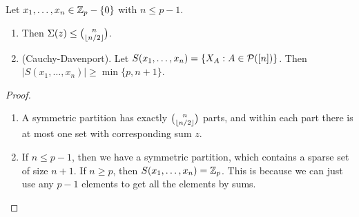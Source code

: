 \begin{corollary} Let $x_1,\dotsc,x_n\in \Z_p\setminus\{0\}$ with $n\leq p-1$.
~\begin{enumerate}
	\item  Then $\Sigma(z) \leq {n \choose \floor{n/2}}$.
	\item (Cauchy-Davenport). Let $S(x_1,\dotsc,x_n) = \{ X_A: A\in \P([n])\}$. Then $|S(x_1,\dotsc,x_n)| \geq \min\{ p,n+1\}$.
\end{enumerate}

\end{corollary}
\begin{proof}	
~ \begin{enumerate}
	\item  A symmetric partition has exactly ${n\choose \floor{n/2}}$ parts, and within each part there is at most one set with corresponding sum $z$.
	\item If $n\leq p-1$, then we have a symmetric partition, which contains a sparse set of size $n+1$. If $n\geq p$, then $S(x_1,\dotsc,x_n) = \Z_p$. This is because we can just use any $p-1$ elements to get all the elements by sums.\qedhere
\end{enumerate}
\end{proof}